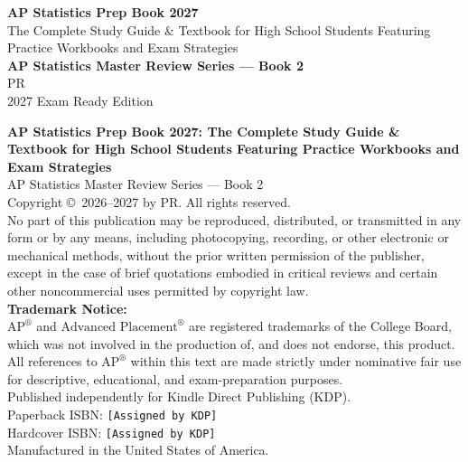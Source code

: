 \documentclass[11pt,oneside,openany]{book}
\newcommand{\BookTitle}{AP Statistics Prep Book 2027}
\newcommand{\BookSubtitle}{The Complete Study Guide \& Textbook for High School Students Featuring Practice Workbooks and Exam Strategies}
\newcommand{\BookSeries}{AP Statistics Master Review Series --- Book 2}
\newcommand{\BookAuthor}{PR}
\newcommand{\Edition}{2027 Exam Ready Edition}
\begin{document}
\frontmatter

\thispagestyle{empty}
\begin{center}
  \vspace*{2cm}
  {\Huge\bfseries\color{MidnightBlue} \BookTitle}\\[12pt]
  {\Large\color{DarkSlateGray} \BookSubtitle}\\[24pt]
  {\large\bfseries \BookSeries}\\[36pt]
  {\Large \BookAuthor}\\[24pt]
  {\normalsize \Edition}
\end{center}
\clearpage

\thispagestyle{empty}
\vspace*{\fill}
\begin{center}
  \begin{minipage}{0.9\linewidth}
    \small
    \textbf{\BookTitle: \BookSubtitle}\\
    \BookSeries\\[6pt]
    Copyright \copyright\ 2026--2027 by \BookAuthor. All rights reserved.\\[10pt]
    No part of this publication may be reproduced, distributed, or transmitted in any form or by any means, including photocopying, recording, or other electronic or mechanical methods, without the prior written permission of the publisher, except in the case of brief quotations embodied in critical reviews and certain other noncommercial uses permitted by copyright law.\\[10pt]
    \textbf{Trademark Notice:}\\
    $\text{AP}^\circledR$ and $\text{Advanced Placement}^\circledR$ are registered trademarks of the College Board, which was not involved in the production of, and does not endorse, this product. All references to $\text{AP}^\circledR$ within this text are made strictly under nominative fair use for descriptive, educational, and exam-preparation purposes.\\[10pt]
    Published independently for Kindle Direct Publishing (KDP).\\
    Paperback ISBN: \texttt{[Assigned by KDP]}\\
    Hardcover ISBN: \texttt{[Assigned by KDP]}\\
    Manufactured in the United States of America.
  \end{minipage}
\end{center}
\vspace*{\fill}
\clearpage
\end{document}
